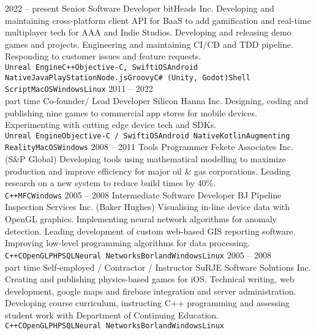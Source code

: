 \documentclass[9pt]{developercv} %
\begin{document}
\begin{entrylist}
	\entry
		{2022 -- present}
		{Senior Software Developer}
		{bitHeads Inc.}
		{Developing and maintaining cross-platform client API for BaaS to add gamification and real-time multiplayer tech for AAA and Indie Studios. Developing and releasing demo games and projects. Engineering and maintaining CI/CD and TDD pipeline. Responding to customer issues and feature requests.\\ \texttt{Unreal Engine}\slashsep\texttt{C++}\slashsep\texttt{Objective-C, Swift}\slashsep\texttt{iOS}\slashsep\texttt{Android Native}\slashsep\texttt{Java}\slashsep\texttt{PlayStation}\slashsep\texttt{Node.js}\slashsep\texttt{Groovy}\slashsep\texttt{C\# (Unity, Godot)}\slashsep\texttt{Shell Script}\slashsep\texttt{MacOS}\slashsep\texttt{Windows}\slashsep\texttt{Linux}}
\entry
		{2011 -- 2022\\\footnotesize{part time}}
		{Co-founder/ Lead Developer}
		{Silicon Hanna Inc.}
		{Designing, coding and publishing nine games to commercial app stores for mobile devices. Experimenting with cutting edge device tech and SDKs.\\ \texttt{Unreal Engine}\slashsep\texttt{Objective-C / Swift}\slashsep\texttt{iOS}\slashsep\texttt{Android Native}\slashsep\texttt{Kotlin}\slashsep\texttt{Augmenting Reality}\slashsep\texttt{MacOS}\slashsep\texttt{Windows}}
	\entry
		{2008 -- 2011}
		{Tools Programmer}
		{Fekete Associates Inc. (S\&P Global)}
		{Developing tools using mathematical modelling to maximize production and improve efficiency for major oil \& gas corporations. Leading research on a new system to reduce build times by 40\%. \\ \texttt{C++}\slashsep\texttt{MFC}\slashsep\texttt{Windows}}
	\entry
		{2005 -- 2008}
		{Intermediate Software Developer}
		{BJ Pipeline Inspection Services Inc. (Baker Hughes)}
		{Visualising in-line device data with OpenGL graphics. Implementing neural network algorithms for anomaly detection. Leading development of custom web-based GIS reporting software. Improving low-level programming algorithms for data processing.\\ \texttt{C++}\slashsep\texttt{C}\slashsep\texttt{OpenGL}\slashsep\texttt{PHP}\slashsep\texttt{SQL}\slashsep\texttt{Neural Networks}\slashsep\texttt{Borland}\slashsep\texttt{Windows}\slashsep\texttt{Linux}}
	\entry
		{2005 -- 2008\\\footnotesize{part time}}
		{Self-employed / Contractor / Instructor}
		{SuRJE Software Solutions Inc.}
		{Creating and publishing physics-based games for iOS. Technical writing, web development, google maps and firebase integration and server administration. Developing course curriculum, instructing C++ programming and assessing student work with Department of Continuing Education.\\ \texttt{C++}\slashsep\texttt{C}\slashsep\texttt{OpenGL}\slashsep\texttt{PHP}\slashsep\texttt{SQL}\slashsep\texttt{Neural Networks}\slashsep\texttt{Borland}\slashsep\texttt{Windows}\slashsep\texttt{Linux}}

\end{entrylist}
\end{document}

